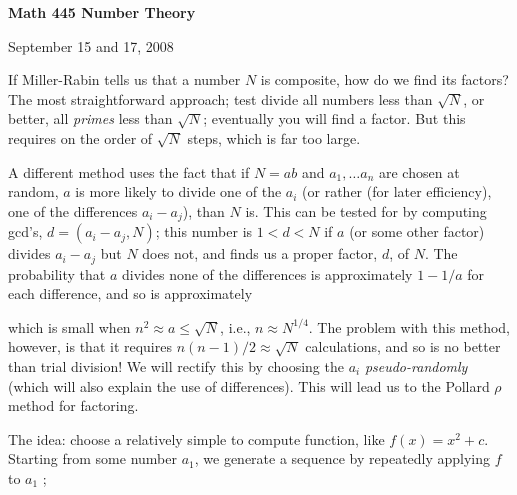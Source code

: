




\nopagenumbers


\def\ctln{\centerline}
\def\u{\underbar}
\def\ssk{\smallskip}
\def\msk{\medskip}
\def\bsk{\bigskip}


\ctln{\bf Math 445 Number Theory}

\medskip

\ctln{September 15 and 17, 2008}

\bsk

If Miller-Rabin tells us that a number $N$ is composite, how do we find its factors? The most straightforward 
approach; test divide all numbers less than $\sqrt{N}$, or better, all {\it primes} less than $\sqrt{N}$; 
eventually you will find a factor. But this requires on the order of $\sqrt{N}$ steps, which is far too
large. 

\msk

A different method uses the fact that if $N=ab$ and $a_1,\ldots a_n$ are chosen at random, $a$ is more 
likely to divide one of the $a_i$ (or rather (for later efficiency), one of the differences $a_i-a_j$), than $N$
is. This can be tested for by computing gcd's, $d=(a_i-a_j,N)$; this number is $1<d<N$ if $a$ (or some other
factor) divides $a_i-a_j$ but $N$ does not, and finds us a proper factor, $d$, of $N$. The probability that
$a$ divides none of the differences is approximately $1-1/a$ for each difference, and so is approximately

\ssk


\ssk

\noindent which is small when $n^2\approx a\leq\sqrt{N}$, i.e., $n\approx N^{1/4}$. The problem with this method,
however, is that it requires $n(n-1)/2 \approx \sqrt{N}$ calculations, and so is no better than trial division! We 
will rectify this by choosing the $a_i$ {\it pseudo-randomly} (which will also explain the use of differences). This
will lead us to the Pollard $\rho$ method for factoring.

\bsk

The idea: choose a relatively simple to compute function, like $f(x)=x^2+c$. 
Starting from some number
$a_1$, we generate a sequence by repeatedly applying $f$ to 
$a_1$ ; 

